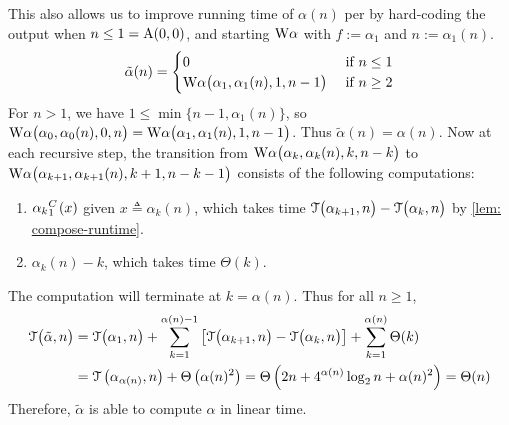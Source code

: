 This also allows us to improve running time of $\alpha(n)$ per  by hard-coding the output when $n\le 1 = \text{A}(0, 0)$, and starting $\text{W}\alpha$ with $f := \alpha_1$ and $n := \alpha_1(n)$.
\begin{equation*}
\tilde{\alpha}(n) = \begin{cases}
0 & \text{ if } n \le 1 \\ \text{W}\alpha\big(\alpha_1, \alpha_1(n), 1, n-1\big) & \text{ if } n \ge 2
\end{cases}
\end{equation*}
For $n > 1$, we have $1\le \min\big\{n-1, \alpha_1(n)\big\}$, so $
\text{W}\alpha\big(\alpha_0, \alpha_0(n), 0, n\big) =
\text{W}\alpha\big(\alpha_1, \alpha_1(n), 1, n-1\big)$.
Thus $\tilde{\alpha}(n) = \alpha(n)$. Now at each recursive step, the transition from $\text{W}\alpha\big(\alpha_k, \alpha_k(n), k, n-k\big)$ to $\text{W}\alpha\big(\alpha_{k+1}, \alpha_{k+1}(n), k+1, n-k-1\big)$ consists of the following computations:
 \begin{enumerate}[label={(\arabic*)}]
	\item $\cdt{\alpha_k}{1}(x)$ given $x\triangleq \alpha_k(n)$, which takes time $\mathcal{T}\big(\alpha_{k+1}, n\big) - \mathcal{T}\big(\alpha_k, n\big)$ by \cref{lem: compose-runtime}.
	\item $\alpha_k(n) - k$, which takes time $\Theta(k)$.
\end{enumerate}
The computation will terminate at $k = \alpha(n)$. Thus for all $n\ge 1$,
\begin{equation} \label{eq: inv-ack-runtime-improved}
\begin{aligned}
\mathcal{T}\big(\tilde{\alpha}, n\big) & = \mathcal{T}\big(\alpha_1, n\big) + \sum_{k=1}^{\alpha(n) - 1}
\left[ \mathcal{T}\big(\alpha_{k+1}, n\big) - \mathcal{T}\big(\alpha_k, n\big)
\right] + \sum_{k=1}^{\alpha(n)}\Theta(k) \\
& = \mathcal{T}\left(\alpha_{\alpha(n)}, n\right) + \Theta\left(\alpha(n)^2\right)
= \Theta\left(2n + 4^{\alpha(n)}\log_2n + \alpha(n)^2\right) = \Theta(n)
\end{aligned}
\end{equation}
Therefore, $\tilde{\alpha}$ is able to compute $\alpha$ in linear time.
